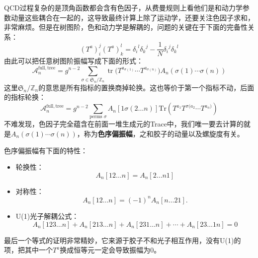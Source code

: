 QCD过程复杂的是顶角函数都会含有色因子，从费曼规则上看他们是和动力学参数动量这些耦合在一起的，这导致最终计算上除了运动学，还要关注色因子求和，非常麻烦。但是在树图阶，色和动力学是解耦的，问题的关键在于下面的完备性关系：
\begin{equation}
	(T^a)_i^j(T^a)_k^l={\delta_i}^l{\delta_k}^j-\frac1N{\delta_i}^j{\delta_k}^l
\end{equation}
由此可以把任意树图阶振幅写成下面的形式：
\begin{equation}
	\mathcal{A}_n^{\mathrm{full,tree}}=g^{n-2}\sum_{\sigma\in\mathfrak{S}_n/\mathbb{Z}_n}\operatorname{tr}\Big(T^{a_{\sigma(1)}}\cdots T^{a_{\sigma(n)}}\Big)A_n(\sigma(1)\cdots\sigma(n))
\end{equation}
这里$\mathfrak{S}_n/\mathbb{Z}_n$的意思是所有指标的置换商掉轮换。这也等价于第一个指标不动，后面的指标轮换：
\begin{equation}
	\mathcal{A}_n^{\mathrm{full,tree}}=g^{n-2}\sum_{\text{perms }\sigma}A_n{\left[1\sigma(2\ldots n)\right]\mathrm{Tr}\left(T^{a_1}T^{\sigma(a_2}\cdots T^{a_n)}\right)}
\end{equation}
不难发现，色因子完全蕴含在前面一堆生成元的Trace中，我们唯一要去计算的就是$A_n(\sigma(1)\cdots\sigma(n))$，称为\textbf{色序偏振幅}，之和胶子的动量以及螺旋度有关。

色序偏振幅有下面的特性：
\begin{itemize}
	\item 轮换性：
	\begin{equation}
		A_n[12\ldots n]=A_n[2\ldots n1]
	\end{equation}
	\item 对称性：
	\begin{equation}
		A_n[12\ldots n]=(-1)^nA_n[n\ldots21].
	\end{equation}
	\item U(1)光子解耦公式：
	\begin{equation}
		A_n[123\ldots n]+A_n[213\ldots n]+A_n[231\ldots n]+\cdots+A_n[23\ldots1n]=0
	\end{equation}
\end{itemize}
最后一个等式的证明非常精妙，它来源于胶子不和光子相互作用，没有U(1)的项，把其中一个$T^a$换成恒等元一定会导致振幅为0。
